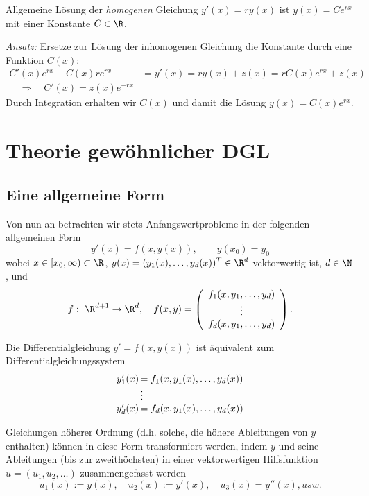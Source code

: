 \documentclass[
]{mycourse}
\theoremstyle{mythm}
\theoremstyle{break}
\begin{document}
Allgemeine Lösung der \emph{homogenen} Gleichung $y'(x)=r y(x)$ ist $y(x)=C e^{rx}$ mit einer Konstante $C\in \R$.

\emph{Ansatz:} Ersetze zur Lösung der inhomogenen Gleichung die Konstante durch eine Funktion $C(x)$:
\begin{align*}
C'(x) e^{rx} + C(x) r e^{rx}& =y'(x)= r y(x) + z(x)= r C(x) e^{rx} + z(x)\\
\quad \Longrightarrow \quad C'(x)= z(x) e^{-rx} 
\end{align*}
Durch Integration erhalten wir $C(x)$ und damit die Lösung $y(x)=C(x)e^{rx}$.



\section{Theorie gewöhnlicher DGL}

\subsection{Eine allgemeine Form}

Von nun an betrachten wir stets Anfangswertprobleme in der folgenden allgemeinen Form
\[
y'(x)=f(x,y(x)), \qquad y(x_0)=y_0
\]
wobei $x\in [x_0,\infty)\subset \R$, $y(x)=(y_1(x),\ldots, y_d(x))^T\in \R^d$ vektorwertig ist, $d\in \N$, und
\[
f:\ \R^{d+1}\to \R^d, \quad f(x,y)=\left( \begin{array}{c} f_1(x,y_1,\ldots,y_d)\\ \vdots \\ f_d(x,y_1,\ldots,y_d) \end{array} \right).
\]

Die Differentialgleichung $y'=f(x,y(x))$ ist äquivalent zum Differentialgleichungssystem
\[
\left. \begin{array}{r@{\,} l} 
y'_1(x) &= f_1(x,y_1(x),\ldots,y_d(x))\\ 
&\vdots\\
y'_d(x) &= f_d(x,y_1(x),\ldots,y_d(x))
\end{array}\right.
\]
 
Gleichungen höherer Ordnung (d.h. solche, die höhere Ableitungen von $y$ enthalten) können 
in diese Form transformiert werden, indem $y$ und seine Ableitungen (bis zur zweithöchsten) in
einer vektorwertigen Hilfsfunktion  $u=(u_1,u_2,\ldots)$ zusammengefasst werden
\[
u_1(x):=y(x), \quad u_2(x):=y'(x), \quad u_3(x)=y''(x), usw.
\]
\end{document}
